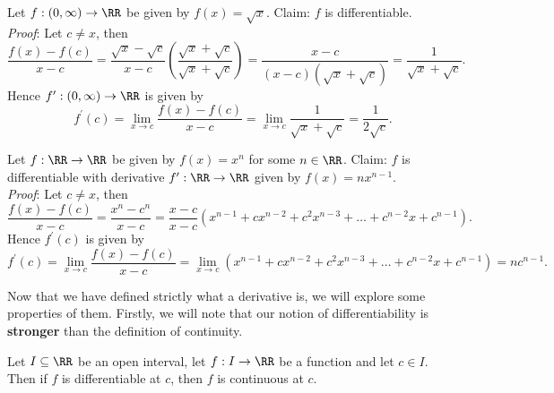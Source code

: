 \documentclass[../real_analysis.tex]{subfiles}
\begin{document}
        \begin{example}
            Let $f:(0,\infty)\to\RR$ be given by $f(x)=\sqrt{x}$. Claim: $f$ is differentiable.\\
            \textit{Proof}: Let $c\neq x$, then
            \begin{equation}
                \frac{f(x)-f(c)}{x-c}=\frac{\sqrt{x}-\sqrt{c}}{x-c}\left(\frac{\sqrt{x}+\sqrt{c}}{\sqrt{x}+\sqrt{c}}\right)=\frac{x-c}{(x-c)(\sqrt{x}+\sqrt{c})}=\frac{1}{\sqrt{x}+\sqrt{c}}.
            \end{equation}
            Hence $f^\prime:(0,\infty)\to\RR$ is given by
            \begin{equation}
                f^\prime(c)=\lim_{x\to c}\frac{f(x)-f(c)}{x-c}=\lim_{x\to c}\frac{1}{\sqrt{x}+\sqrt{c}}=\frac{1}{2\sqrt{c}}.
            \end{equation}
        \end{example}
        \begin{example}
            Let $f:\RR\to\RR$ be given by $f(x)=x^n$ for some $n\in\RR$. Claim: $f$ is differentiable with derivative $f^\prime:\RR\to\RR$ given by $f(x)=nx^{n-1}$.\\
            \textit{Proof}: Let $c\neq x$, then
            \begin{equation}
                \frac{f(x)-f(c)}{x-c}=\frac{x^n-c^n}{x-c}=\frac{x-c}{x-c}(x^{n-1}+cx^{n-2}+c^2x^{n-3}+\dots+c^{n-2}x+c^{n-1}).
            \end{equation}
            Hence $f^\prime(c)$ is given by
            \begin{equation}
                f^\prime(c)=\lim_{x\to c}\frac{f(x)-f(c)}{x-c}=\lim_{x\to c}(x^{n-1}+cx^{n-2}+c^2x^{n-3}+\dots+c^{n-2}x+c^{n-1})=nc^{n-1}.
            \end{equation}
        \end{example}
        Now that we have defined strictly what a derivative is, we will explore some properties of them. Firstly, we will note that our notion of differentiability is \textbf{stronger} than the definition of continuity.
        \begin{theorem}\label{diff-cts}
            Let $I\subseteq\RR$ be an open interval, let $f:I\to\RR$ be a function and let $c\in I$. Then if $f$ is differentiable at $c$, then $f$ is continuous at $c$.
        \end{theorem}
\end{document}
